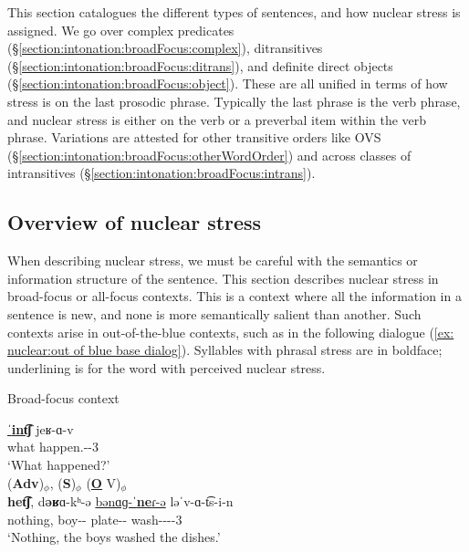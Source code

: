 This section catalogues the different types of sentences, and how  nuclear stress is assigned. We go over  complex predicates (\S\ref{section:intonation:broadFocus:complex}), ditransitives (\S\ref{section:intonation:broadFocus:ditrans}), and definite direct objects (\S\ref{section:intonation:broadFocus:object}).  These are all unified in terms of how stress is on the last prosodic phrase. Typically the last phrase is the verb phrase, and  nuclear stress is either on the verb or a preverbal item within the verb phrase. Variations are attested for other transitive   orders like OVS (\S\ref{section:intonation:broadFocus:otherWordOrder}) and across classes of intransitives (\S\ref{section:intonation:broadFocus:intrans}).  


\subsection{Overview of nuclear stress}\label{section:intonation:broadFocus:overview}

When describing nuclear stress, we must be careful with the semantics or information structure of the sentence. This section describes nuclear stress in broad-focus or all-focus contexts. This is a context where all the information in a sentence is new, and none is more semantically salient than another. Such contexts arise in out-of-the-blue contexts, such as in the following dialogue (\ref{ex: nuclear:out of blue base dialog}). Syllables with phrasal stress are in boldface; underlining is for the word with  perceived nuclear stress. 

\begin{exe}
	\ex Broad-focus context \label{ex: nuclear:out of blue base dialog}
	\begin{xlist}
		\ex \gll \underline{ˈ\textbf{int͡ʃ}} jeʁ-ɑ-v \\ 
		what happen.{\aorperf}-{\pst}-3{\sg} \\
		\trans `What happened?'
		\\ 
		\ex \glll (\textbf{Adv})$_\phi$, (\textbf{S})$_\phi$  (\textbf{\underline{O}} V)$_\phi$ \\
		\textbf{het͡ʃ}, d\textbf{əʁ}ɑ-kʰ-ə   \underline{bənɑɡ-ˈ\textbf{ne}ɾ-ə}  ləˈv-ɑ-t͡s-i-n \\
		nothing, boy-{\pl}-{} plate-{\pl}-{} wash-{\thgloss}-{\aorperf}-{\pst}-3{\pl} \\
		\trans `Nothing, the boys washed the dishes.'\label{ex: nuclear:out of blue base}
		\\ 
	\end{xlist}
\end{exe}

